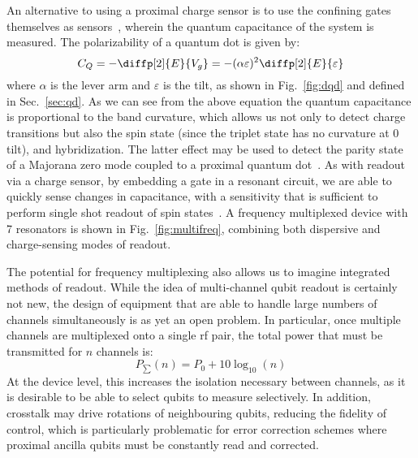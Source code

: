 An alternative to using a proximal charge sensor is to use the confining gates themselves as sensors~\cite{PhysRevLett.110.046805}, wherein the quantum capacitance
of the system is measured. The polarizability of a quantum dot is given by:
\begin{equation}
  C_Q = - \diffp[2]{E}{{V_{g}}} = -(\alpha \varepsilon)^2 \diffp[2]{E}{\varepsilon}
  \label{eq:cq}
\end{equation}
where $\alpha$ is the lever arm and $\varepsilon$ is the tilt, as shown in Fig.~\ref{fig:dqd} and defined in Sec.~\ref{sec:qd}. As we can see from the above equation
the quantum capacitance is proportional to the band curvature, which allows us not only to detect charge transitions but also the spin state (since the triplet state has no
curvature at 0 tilt), and hybridization. The latter effect may be used to detect the parity state of a Majorana zero mode coupled to a proximal
quantum dot~\cite{PhysRevB.95.235305}. As with readout via a charge sensor, by embedding a gate in a resonant circuit, we are able to quickly sense changes
in capacitance, with a sensitivity that is sufficient to perform single shot readout of spin states~\cite{fernando1,Nnano_dzurak}. A frequency multiplexed device
with 7 resonators is shown in Fig.~\ref{fig:multifreq}, combining both dispersive and charge-sensing modes of readout.

The potential for frequency multiplexing also allows us to imagine integrated methods of readout. While the idea of multi-channel qubit readout is certainly
not new, the design of equipment that are able to handle large numbers of channels simultaneously is as yet an open problem. In particular, once multiple
channels are multiplexed onto a single rf pair, the total power that must be transmitted for $n$ channels is:
\begin{equation}
  P_\sum(n) = P_0 + 10 \log_{10}(n)
\end{equation}
At the device level, this increases the isolation necessary between channels, as it is desirable to be able to select qubits to measure selectively. In addition,
crosstalk may drive rotations of neighbouring qubits, reducing the fidelity of control, which is particularly problematic for error correction schemes
where proximal ancilla qubits must be constantly read and corrected.

